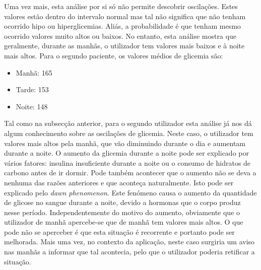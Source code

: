Uma vez mais, esta análise por si só não permite descobrir oscilações. Estes valores estão dentro do intervalo normal mas tal não significa que não tenham ocorrido hipo ou hiperglicemias. Aliás, a probabilidade é que tenham mesmo ocorrido valores muito altos ou baixos. No entanto, esta análise mostra que geralmente, durante as manhãs, o utilizador tem valores mais baixos e à noite mais altos. Para o segundo paciente, os valores médios de glicemia são:

\begin{itemize}
\item Manhã: 165
\item Tarde: 153
\item Noite: 148
\end{itemize}

Tal como na subsecção anterior, para o segundo utilizador esta análise já nos dá algum conhecimento sobre as oscilações de glicemia. Neste caso, o utilizador tem valores mais altos pela manhã, que vão diminuindo durante o dia e aumentam durante a noite. O aumento da glicemia durante a noite pode ser explicado por vários fatores: insulina insuficiente durante a noite ou o consumo de hidratos de carbono antes de ir dormir. Pode também acontecer que o aumento não se deva a nenhuma das razões anteriores e que aconteça naturalmente. Isto pode ser explicado pelo \textit{dawn phenomenon}. Este fenómeno causa o aumento da quantidade de glicose no sangue durante a noite, devido a hormonas que o corpo produz nesse período. Independentemente do motivo do aumento, obviamente que o utilizador de manhã apercebe-se que de manhã tem valores mais altos. O que pode não se aperceber é que esta situação é recorrente e portanto pode ser melhorada. Mais uma vez, no contexto da aplicação, neste caso surgiria um aviso nas manhãs a informar que tal acontecia, pelo que o utilizador poderia retificar a situação.
